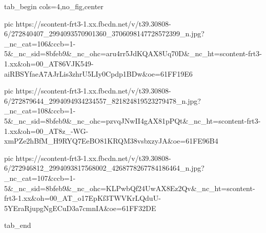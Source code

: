  
 
 
 
 


\ifcmt
  tab_begin cols=4,no_fig,center

     pic https://scontent-frt3-1.xx.fbcdn.net/v/t39.30808-6/272840407_2994093570901360_3706098147728572399_n.jpg?_nc_cat=106&ccb=1-5&_nc_sid=8bfeb9&_nc_ohc=aru4rr5JdKQAX8Uq70D&_nc_ht=scontent-frt3-1.xx&oh=00_AT86VJK549-aiRBSYfaeA7AJrLis3zhrU5LIy0Cpdp1BDw&oe=61FF19E6

     pic https://scontent-frt3-1.xx.fbcdn.net/v/t39.30808-6/272879644_2994094934234557_821824819523279478_n.jpg?_nc_cat=108&ccb=1-5&_nc_sid=8bfeb9&_nc_ohc=pzvqJNwII4gAX81pPQt&_nc_ht=scontent-frt3-1.xx&oh=00_AT8z_-WG-xmPZe2hBfM_H9RYQ7EeBO81KRQM38vsbxzyJA&oe=61FE96B4

     pic https://scontent-frt3-1.xx.fbcdn.net/v/t39.30808-6/272946812_2994093817568002_4268778267784186464_n.jpg?_nc_cat=107&ccb=1-5&_nc_sid=8bfeb9&_nc_ohc=KLPwbQf24UwAX8Ez2Qv&_nc_ht=scontent-frt3-1.xx&oh=00_AT_o17EpKf3TWVKrLQduU-5YEraRjupgNgECuD3a7cmnIA&oe=61FF32DE

  tab_end
\fi
